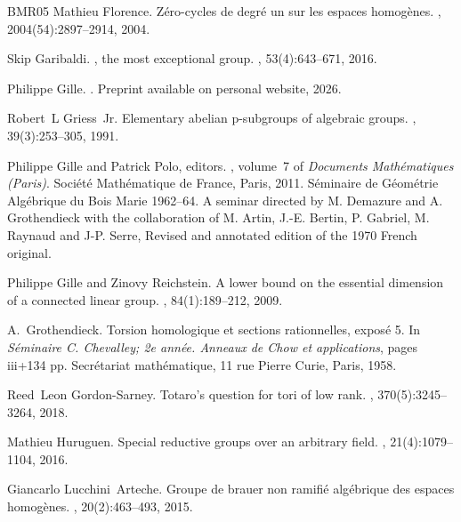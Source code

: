 \begin{thebibliography}{BMR05}
Mathieu Florence.
\newblock Z\'{e}ro-cycles de degr\'{e} un sur les espaces homog\`enes.
, 2004(54):2897--2914, 2004.

Skip Garibaldi.
, the most exceptional group.
, 53(4):643--671, 2016.

Philippe Gille.
.
\newblock Preprint available on personal website, 2026.

Robert~L Griess~Jr.
\newblock Elementary abelian p-subgroups of algebraic groups.
, 39(3):253--305, 1991.

Philippe Gille and Patrick Polo, editors.
, volume~7 of {\em Documents Math\'{e}matiques (Paris)}.
\newblock Soci\'{e}t\'{e} Math\'{e}matique de France, Paris, 2011.
\newblock S\'{e}minaire de G\'{e}om\'{e}trie Alg\'{e}brique du Bois Marie 1962--64. A seminar directed by M. Demazure and A. Grothendieck with the collaboration of M. Artin, J.-E. Bertin, P. Gabriel, M. Raynaud and J-P. Serre, Revised and annotated edition of the 1970 French original.

Philippe Gille and Zinovy Reichstein.
\newblock A lower bound on the essential dimension of a connected linear group.
, 84(1):189--212, 2009.

A.~Grothendieck.
\newblock Torsion homologique et sections rationnelles, expos\'e 5.
\newblock In {\em S\'{e}minaire {C}. {C}hevalley; 2e ann\'{e}e. {A}nneaux de {C}how et applications}, pages iii+134 pp. Secr\'{e}tariat math\'{e}matique, 11 rue Pierre Curie, Paris, 1958.

Reed~Leon Gordon-Sarney.
\newblock Totaro's question for tori of low rank.
, 370(5):3245--3264, 2018.

Mathieu Huruguen.
\newblock Special reductive groups over an arbitrary field.
, 21(4):1079--1104, 2016.

Giancarlo Lucchini~Arteche.
\newblock Groupe de brauer non ramifi{\'e} alg{\'e}brique des espaces homog{\`e}nes.
, 20(2):463--493, 2015.


\end{thebibliography}
